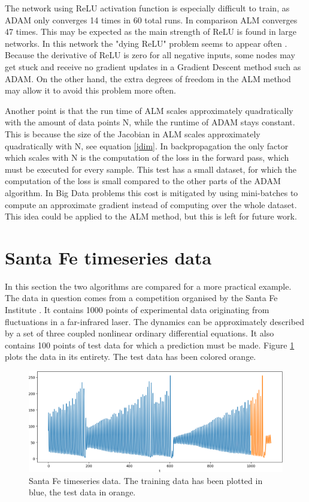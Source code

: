The network using ReLU activation function is especially difficult to train, as ADAM only converges 14 times in 60 total runs. In comparison ALM converges 47 times. This may be expected as the main strength of ReLU is found in large networks. In this network the "dying ReLU" problem seems to appear often \cite{Lu2020}. Because the derivative of ReLU is zero for all negative inputs, some nodes may get stuck and receive no gradient updates in a Gradient Descent method such as ADAM. On the other hand, the extra degrees of freedom in the ALM method may allow it to avoid this problem more often.

Another point is that the run time of ALM scales approximately quadratically with the amount of data points N, while the runtime of ADAM stays constant. This is because the size of the Jacobian in ALM scales approximately quadratically with N, see equation \ref{jdim}. In backpropagation the only factor which scales with N is the computation of the loss in the forward pass, which must be executed for every sample. This test has a small dataset, for which the computation of the loss is small compared to the other parts of the ADAM algorithm. In Big Data problems this cost is mitigated by using mini-batches to compute an approximate gradient instead of computing over the whole dataset. This idea could be applied to the ALM method, but this is left for future work.


\section{Santa Fe timeseries data}
In this section the two algorithms are compared for a more practical example. The data in question comes from a competition organised by the Santa Fe Institute \cite{weigend2018time}. It contains 1000 points of experimental data originating from fluctuations in a far-infrared laser. The dynamics can be approximately described by a set of three coupled nonlinear ordinary differential equations. It also contains 100 points of test data for which a prediction must be made. Figure \ref{santafedata} plots the data in its entirety. The test data has been colored orange.

\begin{figure}
   	\centering
	\includegraphics[width=\textwidth]{santafe}
	\caption{Santa Fe timeseries data. The training data has been plotted in blue, the test data in orange.}
	\label{santafedata}
\end{figure}

